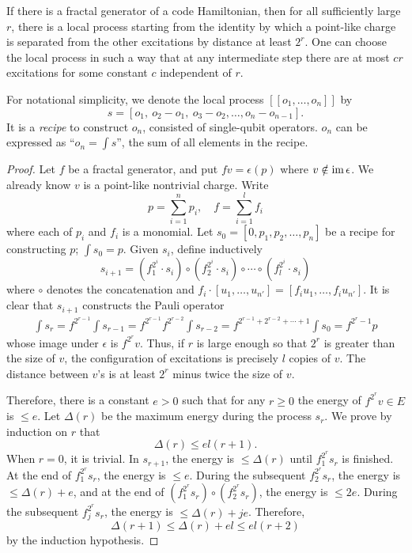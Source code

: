 \begin{theorem}
\cite{NewmanMoore1999Glassy}
If there is a fractal generator of a code Hamiltonian,
then for all sufficiently large $r$,
there is a local process starting from the identity
by which a point-like charge is separated from the other excitations by distance at least $2^r$.
One can choose the local process in such a way that at any intermediate step
there are at most $c r$ excitations for some constant $c$ independent of $r$.
\label{thm:logarithmic-energy-barrier-for-fractal-operator}
\end{theorem}
For notational simplicity, we denote the local process $[[o_1,\ldots,o_n]]$
by
\[
s = [o_1,~ o_2-o_1,~ o_3 - o_2, \ldots, o_n - o_{n-1}].
\]
It is a {\em recipe} to construct $o_n$, consisted of single-qubit operators.
$o_n$ can be expressed as ``$o_n = \int s$'', the sum of all elements in the recipe.
\begin{proof}
Let $f$ be a fractal generator, 
and put $fv = \epsilon (p)$
where $v \notin \mathop{\mathrm{im}}\nolimits \epsilon$.
We already know $v$ is a point-like nontrivial charge.
Write
\[
 p = \sum_{i=1}^n p_i, \quad f = \sum_{i=1}^l f_i
\]
where each of $p_i$ and $f_i$ is a monomial.
Let $s_0 = [ 0, p_1, p_2, \ldots, p_{n}]$ be a recipe for constructing $p$; $\int s_0 = p$.
Given $s_i$, define inductively
\[
 s_{i+1} = (f_1^{2^i} \cdot s_i) \circ (f_2^{2^i} \cdot s_i) \circ \cdots \circ (f_l^{2^i} \cdot s_i) 
\]
where $\circ$ denotes the concatenation and $f_i \cdot [u_1,\ldots,u_{n'}] = [f_i u_1, \ldots, f_i u_{n'}]$.
It is clear that $s_{i+1}$ constructs the Pauli operator
\begin{align*}
\int s_{r} 
= f^{2^{r-1}} \int s_{r-1} = f^{2^{r-1}} f^{2^{r-2}} \int s_{r-2} 
= f^{2^{r-1} + 2^{r-2} + \cdots + 1} \int s_0 = f^{2^r-1} p 
\end{align*}
whose image under $\epsilon$ is $f^{2^r}v$. 
Thus, if $r$ is large enough so that $2^r$ is greater than the size of $v$,
the configuration of excitations is precisely $l$ copies of $v$.
The distance between $v$'s is at least $2^r$ minus twice the size of $v$.

Therefore, there is a constant $e > 0$ such that for any $r \ge 0$
the energy of $f^{2^r}v \in E$ is $\le e$.
Let $\Delta(r)$ be the maximum energy during the process $s_r$.
We prove by induction on $r$ that 
\[
\Delta(r) \le el (r+1).
\]
When $r = 0$, it is trivial.
In $s_{r+1}$, the energy is $\le \Delta(r)$ until $f_1^{2^r} s_r$ is finished.
At the end of $f_1^{2^r} s_r$, the energy is $\le e $.
During the subsequent $f_2^{2^r} s_r$, the energy is $\le \Delta(r) + e$,
and at the end of $(f_1^{2^r} s_r) \circ (f_2^{2^r} s_r)$, the energy is $\le 2 e$.
During the subsequent $f_j^{2^r} s_r$, the energy is $\le \Delta(r) + je$.
Therefore, 
\[
\Delta(r+1) \le \Delta(r) + el \le el(r+2)
\]
by the induction hypothesis.
\end{proof}

